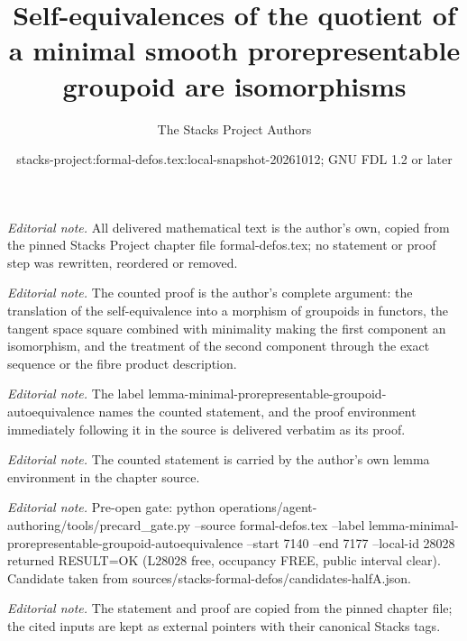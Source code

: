 \documentclass[10pt,a4paper]{amsart}
\title{Self-equivalences of the quotient of a minimal smooth prorepresentable groupoid are isomorphisms}
\author{The Stacks Project Authors}
\date{stacks-project:formal-defos.tex:local-snapshot-20261012; GNU FDL 1.2 or later}
\theoremstyle{plain}
\theoremstyle{definition}
\theoremstyle{remark}
\numberwithin{equation}{subsection}
\begin{document}
\maketitle
\noindent\textit{Editorial note.} All delivered mathematical text is the author's own, copied from the pinned Stacks Project chapter file formal-defos.tex; no statement or proof step was rewritten, reordered or removed.\par\medskip
\noindent\textit{Editorial note.} The counted proof is the author's complete argument: the translation of the self-equivalence into a morphism of groupoids in functors, the tangent space square combined with minimality making the first component an isomorphism, and the treatment of the second component through the exact sequence or the fibre product description.\par\medskip
\noindent\textit{Editorial note.} The label lemma-minimal-prorepresentable-groupoid-autoequivalence names the counted statement, and the proof environment immediately following it in the source is delivered verbatim as its proof.\par\medskip
\noindent\textit{Editorial note.} The counted statement is carried by the author's own lemma environment in the chapter source.\par\medskip
\noindent\textit{Editorial note.} Pre-open gate: python operations/agent-authoring/tools/precard\_gate.py --source formal-defos.tex --label lemma-minimal-prorepresentable-groupoid-autoequivalence --start 7140 --end 7177 --local-id 28028 returned RESULT=OK (L28028 free, occupancy FREE, public interval clear). Candidate taken from sources/stacks-formal-defos/candidates-halfA.json.\par\medskip
\noindent\textit{Editorial note.} The statement and proof are copied from the pinned chapter file; the cited inputs are kept as external pointers with their canonical Stacks tags.\par\medskip
\end{document}
